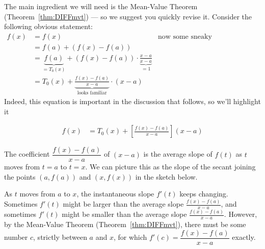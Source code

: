 The main ingredient we will need is the Mean-Value Theorem (Theorem~\ref{thm:DIFFmvt})
--- so we suggest you quickly revise it. Consider the following obvious statement:
\begin{align*}
  f(x) &= f(x) & \text{now some sneaky manipulations}\\
  & = f(a) + (f(x)-f(a)) \\
  &= \underbrace{f(a)}_{=T_0(x)} + (f(x)-f(a)) \cdot \underbrace{\frac{x-a}{x-a}}_{=1} \\
  &= T_0(x) + \underbrace{\frac{f(x)-f(a)}{x-a}}_\text{looks familiar} \cdot (x-a)
\end{align*}
Indeed, this equation is important in the discussion that follows, so we'll highlight it
\begin{impeqn}\label{eq:taylorErrorA}
 \begin{align*}
  f(x) &= T_0(x) + \left[ \frac{f(x)-f(a)}{x-a} \right](x-a)
 \end{align*}
\end{impeqn}
The coefficient $\dfrac{f(x)-f(a)}{x-a}$ of $(x-a)$ is the average slope
of $f(t)$ as $t$ moves from $t=a$ to $t=x$. We can picture this as the slope of the
secant joining the points $(a,f(a))$ and $(x,f(x))$ in the sketch below.

As $t$ moves from $a$ to $x$, the instantaneous slope $f'(t)$ keeps changing. Sometimes
$f'(t)$ might be larger than the average slope $\tfrac{f(x)-f(a)}{x-a}$, and sometimes
$f'(t)$ might be smaller than the average slope $\tfrac{f(x)-f(a)}{x-a}$. However, by the
Mean-Value Theorem (Theorem~\ref{thm:DIFFmvt}), there must be some number $c$, strictly
between $a$ and $x$, for which  $f'(c)=\dfrac{f(x)-f(a)}{x-a}$ exactly.


